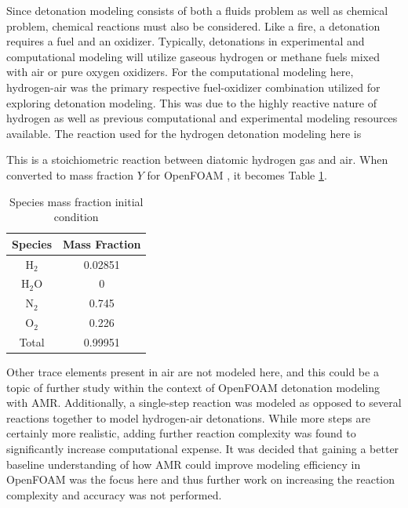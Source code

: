 Since detonation modeling consists of both a fluids problem as well as chemical problem, chemical reactions must also be considered. Like a fire, a detonation requires a fuel and an oxidizer. Typically, detonations in experimental and computational modeling will utilize gaseous hydrogen or methane fuels mixed with air or pure oxygen oxidizers. For the computational modeling here, hydrogen-air was the primary respective fuel-oxidizer combination utilized for exploring detonation modeling. This was due to the highly reactive nature of hydrogen as well as previous computational and experimental modeling resources available. The reaction used \cite{kuo} for the hydrogen detonation modeling here is
\begin{center}
\end{center}
This is a stoichiometric reaction between diatomic hydrogen gas and air. When converted to mass fraction \(Y\) for OpenFOAM \cite{marcantoni}, it becomes Table \ref{tab:y}.

\begin{table}[t!]
\centering
\caption{Species mass fraction initial condition}
\label{tab:y}
\begin{tabular}{cc}
Species & Mass Fraction \\ \hline
H\(_2\) & 0.02851 \\ 
H\(_2\)O & 0 \\
N\(_2\) & 0.745 \\ 
O\(_2\) & 0.226 \\ \hline
Total & 0.99951 \\ 
\end{tabular}
\end{table}

Other trace elements present in air are not modeled here, and this could be a topic of further study within the context of OpenFOAM detonation modeling with AMR. Additionally, a single-step reaction was modeled as opposed to several reactions together to model hydrogen-air detonations. While more steps are certainly more realistic, adding further reaction complexity was found to significantly increase computational expense. It was decided that gaining a better baseline understanding of how AMR could improve modeling efficiency in OpenFOAM was the focus here and thus further work on increasing the reaction complexity and accuracy was not performed. 

